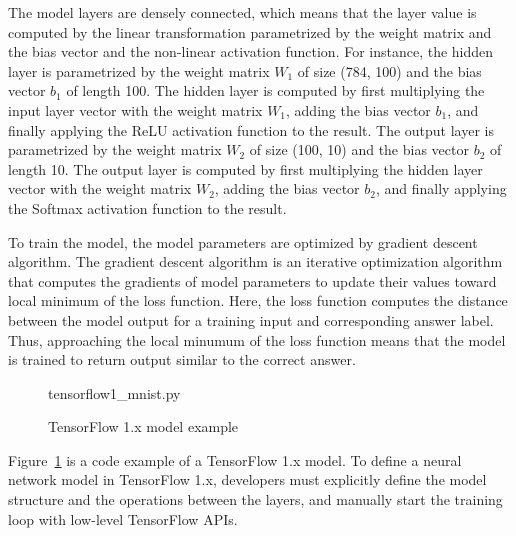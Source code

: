 The model layers are densely connected, which means that
the layer value is computed by the linear transformation parametrized by
the weight matrix and the bias vector and the non-linear activation function.
For instance, the hidden layer is parametrized by the weight matrix
$W_1$ of size (784, 100) and the bias vector $b_1$ of length 100.
The hidden layer is computed by first multiplying the input layer vector
with the weight matrix $W_1$, adding the bias vector $b_1$, and finally applying
the ReLU activation function to the result.
The output layer is parametrized by the weight matrix $W_2$ of size (100, 10)
and the bias vector $b_2$ of length 10.
The output layer is computed by first multiplying the hidden layer vector
with the weight matrix $W_2$, adding the bias vector $b_2$, and finally applying
the Softmax activation function to the result.

To train the model, the model parameters are optimized by gradient descent
algorithm. The gradient descent algorithm is an iterative optimization algorithm
that computes the gradients of model parameters to update their values toward
local minimum of the loss function.
Here, the loss function computes the distance between the model output for
a training input and corresponding answer label.
Thus, approaching the local minumum of the loss function means that the
model is trained to return output similar to the correct answer.


\begin{figure}[ht!]

{tensorflow1_mnist.py}
  \caption{TensorFlow 1.x model example}
\label{fig:back:tf1}
\end{figure}

Figure~\ref{fig:back:tf1} is a code example of a TensorFlow 1.x model.
To define a neural network model in TensorFlow 1.x, 
developers must explicitly define the model structure
and the operations between the layers, 
and manually start the training loop with low-level TensorFlow APIs.

